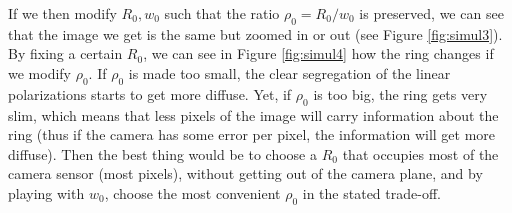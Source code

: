 \documentclass[11pt, a4paper, twoside]{article} %
\begin{document}
If we then modify $R_0,w_0$ such that the ratio $\rho_0=R_0/w_0$ is preserved, we can see that the image we get is the same but zoomed in or out (see Figure \ref{fig:simul3}). By fixing a certain $R_0$, we can see in Figure \ref{fig:simul4} how the ring changes if we modify $\rho_0$. If $\rho_0$ is made too small, the clear segregation of the linear polarizations starts to get more diffuse. Yet, if $\rho_0$ is too big, the ring gets very slim, which means that less pixels of the image will carry information about the ring (thus if the camera has some error per pixel, the information will get more diffuse). Then the best thing would be to choose a $R_0$ that occupies most of the camera sensor (most pixels), without getting out of the camera plane, and by playing with $w_0$, choose the most convenient $\rho_0$ in the stated trade-off.
\end{document}
